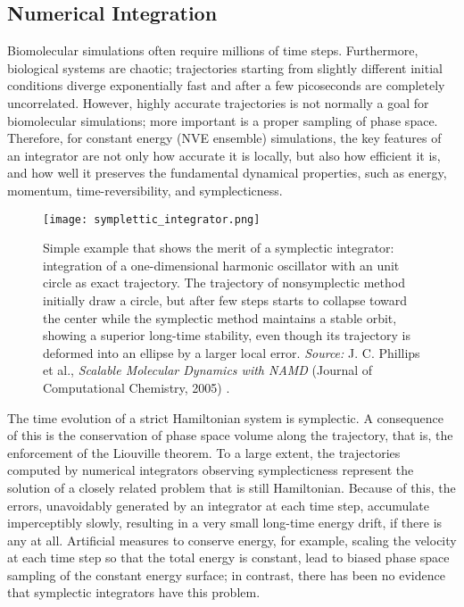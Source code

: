 \subsection{Numerical Integration}
Biomolecular simulations often require millions of time steps. Furthermore, biological systems are chaotic; trajectories starting from slightly different initial conditions diverge exponentially fast and after a few picoseconds are completely uncorrelated. However, highly accurate trajectories is not normally a goal for biomolecular simulations; more important is a proper sampling of phase space. Therefore, for constant energy (NVE ensemble) simulations, the key features of an integrator are not only how accurate it is locally, but also how efficient it is, and how well it preserves the fundamental dynamical properties, such as energy, momentum, time-reversibility, and symplecticness.

\begin{figure}[H]
\centering
\begin{minipage}[t]{0.8\textwidth}
	\centering
    \texttt{[image: symplettic\_integrator.png]}
    
    \footnotesize{\caption{Simple example that shows the merit of a symplectic integrator: integration of a one-dimensional harmonic oscillator with an unit circle as exact trajectory. The trajectory of nonsymplectic method initially draw a circle, but after few steps starts to collapse toward the center while the symplectic method maintains a stable orbit, showing a superior long-time stability, even though its trajectory is deformed into an ellipse by a larger local error.
    \textit{Source:} J. C. Phillips et al., \textit{Scalable Molecular Dynamics with NAMD} (Journal of Computational Chemistry, 2005) 
    \cite{ref:NAMD}.}
    \label{fig:symplettic-integrator}
    }
\end{minipage} 
\end{figure}

The time evolution of a strict Hamiltonian system is symplectic. A consequence of this is the conservation of phase space volume along the trajectory, that is, the enforcement of the Liouville theorem. To a large extent, the trajectories computed by numerical integrators observing symplecticness represent the solution of a closely related problem that is still Hamiltonian. Because of this, the errors, unavoidably generated by an integrator at each time step, accumulate imperceptibly slowly, resulting in a very small long-time energy drift, if there is any at all. Artificial measures to conserve energy, for example, scaling the velocity at each time step so that the total energy is constant, lead to biased phase space sampling of the constant energy surface; in contrast, there has been no evidence that symplectic integrators have this problem.

